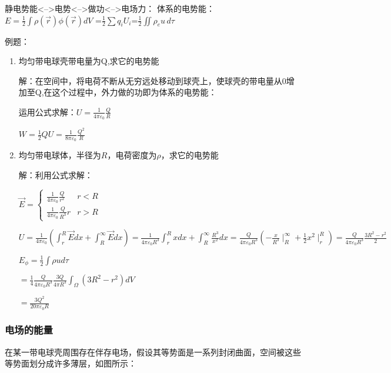 \documentclass[11pt]{ctexart}
\begin{document}
静电势能<-->电势<-->做功<-->电场力：
体系的电势能：$E=\frac{1}{2} \int \rho(\vec{r})\phi(\vec{r})dV$
=$\frac{1}{2} \sum q_iU_i$=$\frac{1}{2} \iint \rho_e u \, d\tau $

\noindent 例题：
\begin{enumerate}
    \item 均匀带电球壳带电量为Q,求它的电势能
        
    解：在空间中，将电荷不断从无穷远处移动到球壳上，使球壳的带电量从0增加至Q,在这个过程中，外力做的功即为体系的电势能：

    运用公式求解：$U=\frac{1}{4 \pi \varepsilon_0} \frac{Q}{R}$
    
    $W=\frac{1}{2}Q U =\frac{1}{8 \pi \varepsilon_0} \frac{Q^2}{R}$

    \item 均匀带电球体，半径为$R$，电荷密度为$\rho$，求它的电势能
    
    解：利用公式求解：

    $\vec{E}=\begin{cases}
        \frac{1}{4 \pi \varepsilon_0} \frac{Q}{r^2} & r<R \\
        \frac{1}{4 \pi \varepsilon_0} \frac{Q}{R^3}  r & r>R
    \end{cases}$
   \vspace{10pt}
   \begin{spacing}{2.0}

    $U=\frac{1}{4 \pi \varepsilon_0} (\int_r^R \vec{E} dx+ \int_R ^\infty \vec{E} dx)
    =\frac{1}{4 \pi \varepsilon_0 R^3} \int_r^R x dx+ \int_R ^\infty \frac{R^3}{x^2} dx
    =\frac{Q}{4 \pi \varepsilon_0 R^3}(-\frac{x}{R^3} \mid_R^\infty + \frac{1}{2} x^2\mid_r^R)
    =\frac{Q}{4 \pi \varepsilon_0 R ^3} \frac{3R^2-r^2}{2}$
    
    $ E_\phi =\frac{1}{2} \int \rho u d\tau$

    $= \frac{1}{4} \frac{Q}{4 \pi \varepsilon_0 R^3} \frac{3Q}{4 \pi R^3} \int_{\Omega} (3R^2-r^2)dV$

   \end{spacing}
   \vspace{10pt}
    $=\frac{3 Q^2}{20 \pi \varepsilon_0 R }$
    

\end{enumerate}
\subsubsection{电场的能量}
在某一带电球壳周围存在伴存电场，假设其等势面是一系列封闭曲面，空间被这些等势面划分成许多薄层，如图所示：
\end{document}
